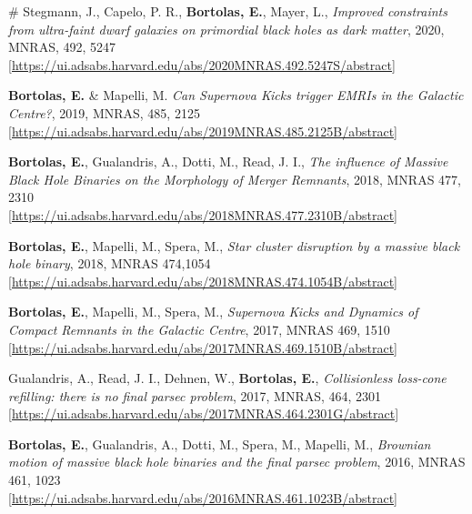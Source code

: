 \begin{etaremune}

\item  \# Stegmann, J., Capelo, P. R.,  {\bf Bortolas, E.}, Mayer, L., { \it Improved constraints from ultra-faint dwarf galaxies on primordial black holes as dark matter}, 2020, MNRAS, 492, 5247\\ \href{https://ui.adsabs.harvard.edu/abs/2020MNRAS.492.5247S/abstract}{\scriptsize [https://ui.adsabs.harvard.edu/abs/2020MNRAS.492.5247S/abstract]}

\item {\bf Bortolas, E.} \& Mapelli, M. { \it Can Supernova Kicks trigger EMRIs in the Galactic Centre?}, 2019, MNRAS, 485, 2125 \\ \href{https://ui.adsabs.harvard.edu/abs/2019MNRAS.485.2125B/abstract}{\scriptsize [https://ui.adsabs.harvard.edu/abs/2019MNRAS.485.2125B/abstract]}

\item {\bf Bortolas, E.}, Gualandris, A., Dotti, M., Read, J. I., { \it The influence of Massive Black Hole Binaries on the Morphology of Merger Remnants},  2018, MNRAS 477, 2310 \\ \href{https://ui.adsabs.harvard.edu/abs/2018MNRAS.477.2310B/abstract}{\scriptsize [https://ui.adsabs.harvard.edu/abs/2018MNRAS.477.2310B/abstract]}

\item {\bf Bortolas, E.}, Mapelli, M., Spera, M., { \it Star cluster disruption by a massive black hole binary}, 2018, MNRAS 474,1054 \\ \href{https://ui.adsabs.harvard.edu/abs/2018MNRAS.474.1054B/abstract}{\scriptsize [https://ui.adsabs.harvard.edu/abs/2018MNRAS.474.1054B/abstract]}

\item {\bf Bortolas, E.}, Mapelli, M., Spera, M., {\it Supernova Kicks and Dynamics of Compact Remnants in the Galactic Centre}, 2017, MNRAS 469, 1510 \\ \href{https://ui.adsabs.harvard.edu/abs/2017MNRAS.469.1510B/abstract}{\scriptsize [https://ui.adsabs.harvard.edu/abs/2017MNRAS.469.1510B/abstract]} 

\item Gualandris, A., Read, J. I., Dehnen, W., {\bf Bortolas, E.}, {\it Collisionless loss-cone refilling: there is no final parsec problem}, 2017, MNRAS, 464, 2301 
\\ \href{https://ui.adsabs.harvard.edu/abs/2017MNRAS.464.2301G/abstract}{\scriptsize [https://ui.adsabs.harvard.edu/abs/2017MNRAS.464.2301G/abstract]}


\item {\bf Bortolas, E.}, Gualandris, A., Dotti, M., Spera, M., Mapelli, M., {\it Brownian motion of massive black hole binaries and the final parsec problem}, 2016, MNRAS 461, 1023 \\ \href{https://ui.adsabs.harvard.edu/abs/2016MNRAS.461.1023B/abstract}{\scriptsize [https://ui.adsabs.harvard.edu/abs/2016MNRAS.461.1023B/abstract]}


\end{etaremune}

